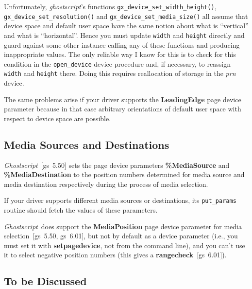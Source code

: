 \documentclass[twoside,a4paper]{article}
\newcommand{\gs}{\textit{ghostscript\/}}
\newcommand{\Gs}{\textit{Ghostscript\/}}
\newcommand{\ps}[1]{{\sffamily\bfseries #1}}	%
\newcommand{\prog}[1]{\texttt{#1}}
\newif\ifdraft \draftfalse
\begin{document}
Unfortunately, \gs's functions \prog{gx\_device\_set\_width\_height()},
\prog{gx\_device\_set\_resolution()} and \prog{gx\_device\_set\_media\_size()}
all assume that device space and default user space have the same notion about
what is ``vertical'' and what is ``horizontal''.
Hence you must update \prog{width} and \prog{height} directly and guard against
some other instance calling any of these functions and producing inappropriate
values.
The only reliable way I know for this
is to check for this condition in the \prog{open\_device} device procedure and,
if necessary, to reassign \prog{width} and \prog{height} there.
Doing this requires reallocation of storage in the \textit{prn\/} device.

\ifdraft
??? Problem of the initial matrix routine having the necessary information
\fi

The same problems arise if your driver supports the \ps{LeadingEdge} page
device parameter because in that case arbitrary orientations of default user
space with respect to device space are possible.


\subsection{Media Sources and Destinations}

\Gs~[gs~5.50] sets the page device parameters \ps{\%MediaSource} and
\ps{\%MediaDestination} to the position numbers determined for media source and
media destination respectively
during the process of media selection.

If your driver supports different media sources or destinations,
its \prog{put\_params} routine should fetch the values of these parameters.

\Gs\ does support the \ps{MediaPosition} page device parameter for
media selection~[gs~5.50, gs~6.01],
but not by default as a device parameter
(i.e., you must set it with \ps{setpagedevice}, not from the command line),
and you can't use it to select negative position numbers
(this gives a \ps{rangecheck}~[gs~6.01]).


\ifdraft
\subsection{To be Discussed}	%
\end{document}
